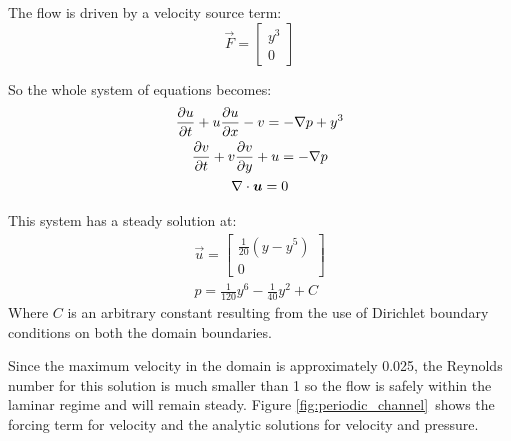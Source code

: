 The flow is driven by a velocity source term:
\begin{equation}
  \vec{F}=
  \begin{bmatrix}
    y^3 \\
    0
  \end{bmatrix}
\end{equation}

So the whole system of equations becomes:
\begin{gather}
  \ppt{u}+u\ppt[x]{u}-v=-\grad p +y^3\\
  \ppt{v}+v\ppt[y]{v}+u=-\grad p \\
  \div\vec{u}=0
\end{gather}

This system has a steady solution at:
\begin{gather}
  \vec{u}=
  \begin{bmatrix}
    \frac{1}{20}(y-y^5)\\
    0
  \end{bmatrix}\\
  p=\frac{1}{120}y^6-\frac{1}{40}y^2+C
\end{gather}
Where $C$ is an arbitrary constant resulting from the use of Dirichlet
boundary conditions on both the domain boundaries.

Since the maximum velocity in the domain is approximately 0.025, the
Reynolds number for this solution is much smaller than 1 so the flow is
safely within the laminar regime and will remain steady. Figure
\ref{fig:periodic_channel}\ shows the forcing term for velocity and the
analytic solutions for velocity and pressure.


